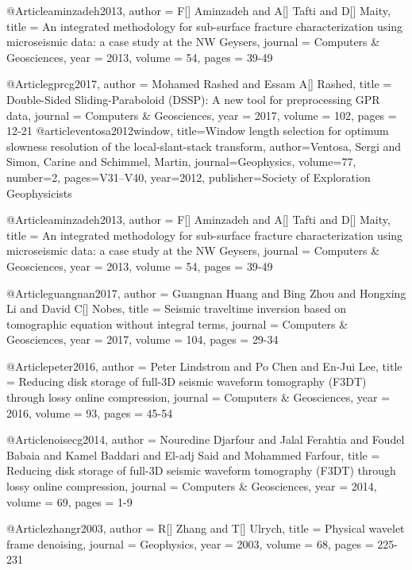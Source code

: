 @Article{aminzadeh2013,
  author = 	 {F[] Aminzadeh and A[] Tafti and D[] Maity},
  title = 	 {An integrated methodology for sub-surface fracture characterization using microseismic data: a case study at the NW {G}eysers},
  journal = 	 { Computers \& Geosciences},
  year = 	 2013,
  volume = 	 54,
  pages = 	 {39-49}}

@Article{gprcg2017,
  author = 	 {Mohamed Rashed and Essam A[] Rashed},
  title = 	 {Double-Sided Sliding-Paraboloid (DSSP): A new tool for preprocessing GPR data},
  journal = 	 { Computers \& Geosciences},
  year = 	 2017,
  volume = 	 102,
  pages = 	 {12-21}}
@article{ventosa2012window,
  title={Window length selection for optimum slowness resolution of the local-slant-stack transform},
  author={Ventosa, Sergi and Simon, Carine and Schimmel, Martin},
  journal={Geophysics},
  volume={77},
  number={2},
  pages={V31--V40},
  year={2012},
  publisher={Society of Exploration Geophysicists}
}

@Article{aminzadeh2013,
  author = 	 {F[] Aminzadeh and A[] Tafti and D[] Maity},
  title = 	 {An integrated methodology for sub-surface fracture characterization using microseismic data: a case study at the NW {G}eysers},
  journal = 	 { Computers \& Geosciences},
  year = 	 2013,
  volume = 	 54,
  pages = 	 {39-49}}
  
 @Article{guangnan2017,
  author = 	 {Guangnan Huang and Bing Zhou and Hongxing Li and David C[] Nobes},
  title = 	 {Seismic traveltime inversion based on tomographic equation without integral terms},
  journal = 	 { Computers \& Geosciences},
  year = 	 2017,
  volume = 	 104,
  pages = 	 {29-34}} 

 @Article{peter2016,
  author = 	 {Peter Lindstrom and Po Chen and En-Jui Lee},
  title = 	 {Reducing disk storage of full-3{D} seismic waveform tomography ({F3DT}) through lossy online compression},
  journal = 	 { Computers \& Geosciences},
  year = 	 2016,
  volume = 	 93,
  pages = 	 {45-54}} 
  
 @Article{noisecg2014,
  author = 	 {Nouredine Djarfour and Jalal Ferahtia and Foudel Babaia and Kamel Baddari and El-adj Said and Mohammed Farfour},
  title = 	 {Reducing disk storage of full-3{D} seismic waveform tomography (F3DT) through lossy online compression},
  journal = 	 { Computers \& Geosciences},
  year = 	 2014,
  volume = 	 69,
  pages = 	 {1-9}} 
  


@Article{zhangr2003,
  author = 	 {R[] Zhang and T[] Ulrych},
  title = 	 {Physical wavelet frame denoising},
  journal = 	 {Geophysics},
  year = 	 2003,
  volume = 	 68,
  pages = 	 {225-231}}

